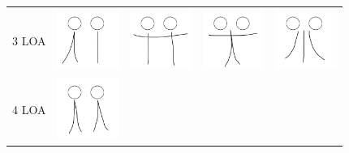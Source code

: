 \documentclass[12pt, a4paper]{memoir}
\begin{document}
\begin{table}[!htb]
\begin{tabular}{ | c | c || c | c | c | }
\begin{minipage}{.15\textwidth}
    \end{minipage} & 
    \\ \hline
    3 LOA 
    &
    \begin{minipage}{.15\textwidth}
      \includegraphics[width=\linewidth, height=20mm]{img/3loa_separate_keyframe}
    \end{minipage}
    &
    \begin{minipage}{.15\textwidth}
      \includegraphics[width=\linewidth, height=20mm]{img/04keyframe}
    \end{minipage}
    &
    \begin{minipage}{.15\textwidth}
      \includegraphics[width=\linewidth, height=20mm]{img/05keyframe}
    \end{minipage} 
    & 
    \begin{minipage}{.15\textwidth}
      \includegraphics[width=\linewidth, height=20mm]{img/06keyframe}
    \end{minipage} 
    \\ \hline
    4 LOA 
    &
    \begin{minipage}{.15\textwidth}
      \includegraphics[width=\linewidth, height=20mm]{img/4loa_separate_keyframe}
    \end{minipage}
    &
    \begin{minipage}{.15\textwidth}

\end{minipage}
\end{tabular}
\end{table}
\end{document}
